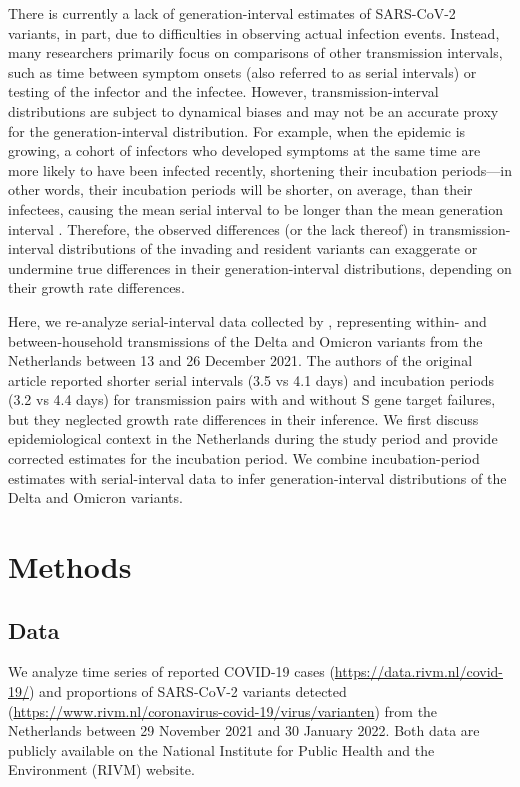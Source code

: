 \documentclass[12pt]{article}
\begin{document}
There is currently a lack of generation-interval estimates of SARS-CoV-2 variants, in part, due to difficulties in observing actual infection events.
Instead, many researchers primarily focus on comparisons of other transmission intervals, such as time between symptom onsets (also referred to as serial intervals) or testing \citep{abbott2022test} of the infector and the infectee.
However, transmission-interval distributions are subject to dynamical biases and may not be an accurate proxy for the generation-interval distribution.
For example, when the epidemic is growing, a cohort of infectors who developed symptoms at the same time are more likely to have been infected recently, shortening their incubation periods---in other words, their incubation periods will be shorter, on average, than their infectees, causing the mean serial interval to be longer than the mean generation interval \citep{park2021forward}.
Therefore, the observed differences (or the lack thereof) in transmission-interval distributions of the invading and resident variants can exaggerate or undermine true differences in their generation-interval distributions, depending on their growth rate differences.

Here, we re-analyze serial-interval data collected by \citep{backer2021omicron}, representing within- and between-household transmissions of the Delta and Omicron variants from the Netherlands between 13 and 26 December 2021.
The authors of the original article reported shorter serial intervals (3.5 vs 4.1 days) and incubation periods (3.2 vs 4.4 days) for transmission pairs with and without S gene target failures, but they neglected growth rate differences in their inference.
We first discuss epidemiological context in the Netherlands during the study period and provide corrected estimates for the incubation period.
We combine incubation-period estimates with serial-interval data to infer generation-interval distributions of the Delta and Omicron variants.

\section{Methods}

\subsection{Data}

We analyze time series of reported COVID-19 cases (\url{https://data.rivm.nl/covid-19/}) and proportions of SARS-CoV-2 variants detected (\url{https://www.rivm.nl/coronavirus-covid-19/virus/varianten}) from the Netherlands between 29 November 2021 and 30 January 2022.
Both data are publicly available on the National Institute for Public Health and the Environment (RIVM) website.
\end{document}
